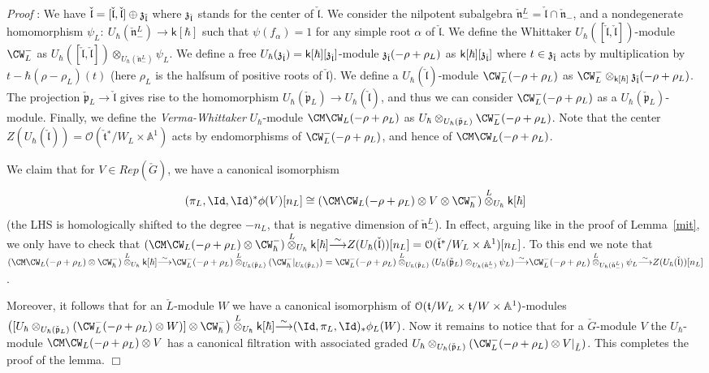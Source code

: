 \documentclass[11pt]{amsart}
\theoremstyle{definition}
\theoremstyle{remark}
\renewcommand{\O}{{\mathcal O}}
\theoremstyle{remark}
\newcommand{\cal}{\mathcal}
\newcommand{\iso}{{\stackrel{\sim}{\longrightarrow}}}
\newcommand{\<}{\langle}
\renewcommand{\>}{\rangle}
\renewcommand{\t}{{\frak t}}
\newcommand{\z}{{\frak z}}
\newcommand{\Ll}{\check{\mathfrak l}{}}
\newcommand{\Ln}{\check{\mathfrak n}{}}
\newcommand{\Lp}{\check{\mathfrak p}{}}
\newcommand{\Lt}{\check{\mathfrak t}{}}
\newcommand{\LG}{{\check{G}}}
\newcommand{\LL}{\check{L}{}}
\renewcommand{\O}{{\cal O}}
\newcommand{\Aone}{{\mathbb A}^1}
\newcommand{\kk}{\mathsf k}
\renewcommand{\proof}{{\it Proof }}
\begin{document}
\proof:
We have $\Ll=[\Ll,\Ll]\oplus\z_{\Ll}$ where $\z_{\Ll}$ stands for the
center of $\Ll$. We consider the nilpotent subalgebra $\Ln_-^L=\Ll\cap\Ln_-$,
and a nondegenerate homomorphism $\psi_L:\ U_\hbar(\Ln_-^L)\to\kk[\hbar]$
such that $\psi(f_\alpha)=1$ for any simple root $\alpha$ of $\Ll$.
We define the Whittaker $U_\hbar([\Ll,\Ll])$-module $\CW^-_L$ as
$U_\hbar([\Ll,\Ll])\otimes_{U_\hbar(\Ln_-^L)}\psi_L$. 
We define a free $U_\hbar(\z_{\Ll})=\kk[\hbar][\z_{\Ll}]$-module
$\z_{\Ll}(-\rho+\rho_L)$ as $\kk[\hbar][\z_{\Ll}]$ where $t\in\z_{\Ll}$
acts by multiplication by $t-\hbar(\rho-\rho_L)(t)$ (here $\rho_L$ is
the halfsum of positive roots of $\Ll$). 
We define a $U_\hbar(\Ll)$-module $\CW^-_L(-\rho+\rho_L)$ as
$\CW^-_L\otimes_{\kk[\hbar]}\z_{\Ll}(-\rho+\rho_L)$.
The projection $\Lp_L\to\Ll$ gives rise to the homomorphism
$U_\hbar(\Lp_L)\to U_\hbar(\Ll)$, and thus we can consider
$\CW^-_L(-\rho+\rho_L)$ as a $U_\hbar(\Lp_L)$-module.
Finally, we define the {\em Verma-Whittaker} $U_\hbar$-module
$\CM\CW_L(-\rho+\rho_L)$ as 
$U_\hbar\otimes_{U_\hbar(\Lp_L)}\CW^-_L(-\rho+\rho_L)$. Note that the
center $Z(U_\hbar(\Ll))=\O(\Lt^*/W_L\times\Aone)$ acts by endomorphisms
of $\CW^-_L(-\rho+\rho_L)$, and hence of $\CM\CW_L(-\rho+\rho_L)$.

We claim that for $V\in Rep(\LG)$, we have a canonical isomorphism
$$(\pi_L,\Id,\Id)^*\phi(V)[n_L]\cong
(\CM\CW_L(-\rho+\rho_L)\otimes 
V\otimes\CW^-_\hbar)\overset{L}{\otimes}_{U_\hbar}\kk[\hbar]$$ (the LHS
is homologically shifted to the degree $-n_L$, that is negative dimension
of $\Ln_-^L$).
In effect, arguing like in the proof of Lemma~\ref{mit}, we only have
to check that $(\CM\CW_L(-\rho+\rho_L)\otimes\CW^-_\hbar)
\overset{L}{\otimes}_{U_\hbar}
\kk[\hbar]\iso Z(U_\hbar(\Ll))[n_L]=\O(\Lt^*/W_L\times\Aone)[n_L]$.
To this end we note that $(\CM\CW_L(-\rho+\rho_L)\otimes\CW^-_\hbar)
\overset{L}{\otimes}_{U_\hbar}\kk[\hbar]\iso
\CW^-_L(-\rho+\rho_L)\overset{L}{\otimes}_{U_\hbar(\Lp_L)}
(\CW^-_\hbar|_{U_\hbar(\Lp_L)})=
\CW^-_L(-\rho+\rho_L)\overset{L}{\otimes}_{U_\hbar(\Lp_L)}
(U_\hbar(\Lp_L)\otimes_{U_\hbar(\Ln_-^L)}\psi_L)\iso
\CW^-_L(-\rho+\rho_L)\overset{L}{\otimes}_{U_\hbar(\Ln_-^L)}\psi_L\iso
Z(U_\hbar(\Ll))[n_L]$.

Moreover, it follows that for an $\LL$-module $W$ we have a canonical
isomorphism of $\O(\t/W_L\times\t/W\times\Aone)$-modules
$\left([U_\hbar\otimes_{U_\hbar(\Lp_L)}(\CW^-_L(-\rho+\rho_L)\otimes W)]
\otimes\CW^-_\hbar\right)\overset{L}{\otimes}_{U_\hbar}\kk[\hbar]\iso
(\Id,\pi_L,\Id)_*\phi_L(W)$. Now it remains to notice that for a $\LG$-module
$V$ the $U_\hbar$-module $\CM\CW_L(-\rho+\rho_L)\otimes V$ has a canonical
filtration with associated graded 
$U_\hbar\otimes_{U_\hbar(\Lp_L)}(\CW^-_L(-\rho+\rho_L)\otimes V|_{\LL})$.
This completes the proof of the lemma.
\hfill $\Box$
\end{document}
